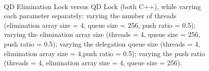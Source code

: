 \begin{figure}[]
\centering
{}
\\
\caption[]{QD Elimination Lock versus QD Lock (both C++), while varying each parameter separately:  varying the number of threads (elimination array size = 4, queue size = 256, push ratio = 0.5);  varying the elimination array size (threads = 4, queue size = 256, push ratio = 0.5);  varying the delegation queue size (threads = 4, elimination array size = 4,push ratio = 0.5);  varying the push ratio (threads = 4, elimination array size = 4, queue size = 256).}
\label{fig:final}
\end{figure}

